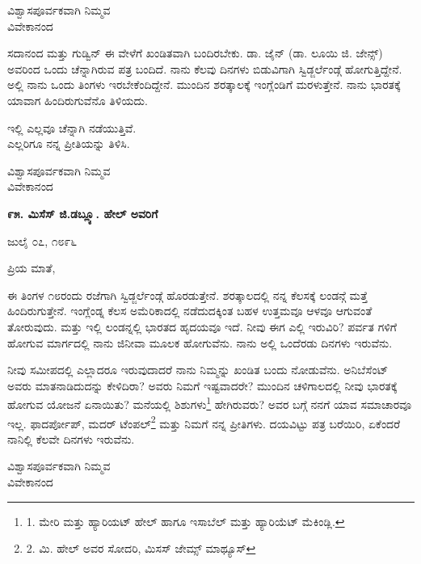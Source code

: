 \begin{flushright}
ವಿಶ್ವಾಸಪೂರ್ವಕವಾಗಿ ನಿಮ್ಮವ\\ವಿವೇಕಾನಂದ
\end{flushright}

ಸದಾನಂದ ಮತ್ತು ಗುಡ್ವಿನ್ ಈ ವೇಳೆಗೆ ಖಂಡಿತವಾಗಿ ಬಂದಿರಬೇಕು. ಡಾ. ಜೈನ್ (ಡಾ. ಲೂಯಿ ಜಿ. ಜೇನ್ಸ್) ಅವರಿಂದ ಒಂದು ಚೆನ್ನಾಗಿರುವ ಪತ್ರ ಬಂದಿದೆ. ನಾನು ಕೆಲವು ದಿನಗಳು ಬಿಡುವಿಗಾಗಿ ಸ್ವಿಡ್ಜರ್ಲೆಂಡ್ಗೆ ಹೋಗುತ್ತಿದ್ದೇನೆ. ಅಲ್ಲಿ ನಾನು ಒಂದು ತಿಂಗಳು ಇರಬೇಕೆಂದಿದ್ದೇನೆ. ಮುಂದಿನ ಶರತ್ಕಾಲಕ್ಕೆ ಇಂಗ್ಲೆಂಡಿಗೆ ಮರಳುತ್ತೇನೆ. ನಾನು ಭಾರತಕ್ಕೆ ಯಾವಾಗ ಹಿಂದಿರುಗುವೆನೊ ತಿಳಿಯದು.

\begin{myquote}
ಇಲ್ಲಿ ಎಲ್ಲವೂ ಚೆನ್ನಾಗಿ ನಡೆಯುತ್ತಿವೆ.\\ಎಲ್ಲರಿಗೂ ನನ್ನ ಪ್ರೀತಿಯನ್ನು ತಿಳಿಸಿ.
\end{myquote}

\begin{flushright}
ವಿಶ್ವಾಸಪೂರ್ವಕವಾಗಿ ನಿಮ್ಮವ\\ವಿವೇಕಾನಂದ
\end{flushright}

\begin{center}
\textbf{೯೫. ಮಿಸೆಸ್ ಜಿ.ಡಬ್ಲ್ಯೂ. ಹೇಲ್ ಅವರಿಗೆ}
\end{center}

\begin{flushright}
ಜುಲೈ ೦೭, ೧೮೯೬
\end{flushright}

ಪ್ರಿಯ ಮಾತೆ,

ಈ ತಿಂಗಳ ೧೮ರಂದು ರಜೆಗಾಗಿ ಸ್ವಿಡ್ಜರ್ಲೆಂಡ್ಗೆ ಹೊರಡುತ್ತೇನೆ. ಶರತ್ಕಾಲದಲ್ಲಿ ನನ್ನ ಕೆಲಸಕ್ಕೆ ಲಂಡನ್ಗೆ ಮತ್ತೆ ಹಿಂದಿರುಗುತ್ತೇನೆ. ಇಂಗ್ಲೆಂಡ್ನ ಕೆಲಸ ಅಮೆರಿಕಾದಲ್ಲಿ ನಡೆದುದಕ್ಕಿಂತ ಬಹಳ ಉತ್ತಮವೂ ಆಳವೂ ಆಗುವಂತೆ ತೋರುವುದು. ಮತ್ತು ಇಲ್ಲಿ ಲಂಡನ್ನಲ್ಲಿ ಭಾರತದ ಹೃದಯವೂ ಇದೆ. ನೀವು ಈಗ ಎಲ್ಲಿ ಇರುವಿರಿ? ಪರ್ವತ ಗಳಿಗೆ ಹೋಗುವ ಮಾರ್ಗದಲ್ಲಿ ನಾನು ಜಿನೀವಾ ಮೂಲಕ ಹೋಗುವೆನು. ನಾನು ಅಲ್ಲಿ ಒಂದೆರಡು ದಿನಗಳು ಇರುವೆನು.

ನೀವು ಸಮೀಪದಲ್ಲಿ ಎಲ್ಲಾದರೂ ಇರುವುದಾದರೆ ನಾನು ನಿಮ್ಮನ್ನು ಖಂಡಿತ ಬಂದು ನೋಡುವೆನು. ಅನಿಬೆಸೆಂಟ್ ಅವರು ಮಾತನಾಡಿದುದನ್ನು ಕೇಳಿದಿರಾ? ಅವರು ನಿಮಗೆ ಇಷ್ಟವಾದರೇ? ಮುಂದಿನ ಚಳಿಗಾಲದಲ್ಲಿ ನೀವು ಭಾರತಕ್ಕೆ ಹೋಗುವ ಯೋಜನೆ ಏನಾಯಿತು? ಮನೆಯಲ್ಲಿ ಶಿಶುಗಳು\footnote{1. ಮೇರಿ ಮತ್ತು ಹ್ಯಾರಿಯಟ್ ಹೇಲ್ ಹಾಗೂ ಇಸಾಬೆಲ್ ಮತ್ತು ಹ್ಯಾರಿಯೆಟ್ ಮೆಕಿಂಡ್ಲಿ.} ಹೇಗಿರುವರು? ಅವರ ಬಗ್ಗೆ ನನಗೆ ಯಾವ ಸಮಾಚಾರವೂ ಇಲ್ಲ. ಫಾದರ್ಪೋಪ್, ಮದರ್ ಟೆಂಪಲ್\footnote{2. ಮಿ. ಹೇಲ್ ಅವರ ಸೋದರಿ, ಮಿಸಸ್ ಜೇಮ್ಸ್ ಮಾಥ್ಯೂಸ್} ಮತ್ತು ನಿಮಗೆ ನನ್ನ ಪ್ರೀತಿಗಳು. ದಯವಿಟ್ಟು ಪತ್ರ ಬರೆಯಿರಿ, ಏಕೆಂದರೆ ನಾನಿಲ್ಲಿ ಕೆಲವೇ ದಿನಗಳು ಇರುವೆನು.

\begin{flushright}
ವಿಶ್ವಾಸಪೂರ್ವಕವಾಗಿ ನಿಮ್ಮವ\\ವಿವೇಕಾನಂದ
\end{flushright}

